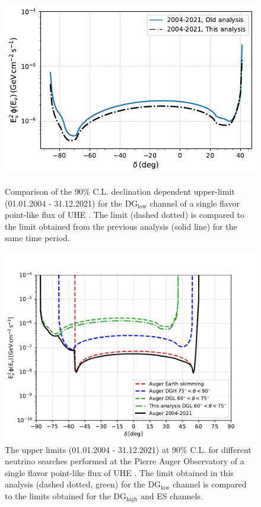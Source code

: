 \begin{figure}[h!]
  \centering
  \includegraphics[width=\textwidth]{thesis_figures/PointLimits/Point_comp_combined_2.pdf}
  \caption{Comparison of the 90\% C.L. declination dependent upper-limit (01.01.2004 - 31.12.2021) for the DG$_{\text{low}}$ channel of a single flavor point-like flux of UHE . The limit (dashed dotted) is compared to the limit obtained from the previous analysis (solid line) for the same time period.}
  \label{fig:Dec_limit_comb2}
  \includegraphics[width=\textwidth]{thesis_figures/PointLimits/Point_comp_combined_3.pdf}
  \caption{The upper limits  (01.01.2004 - 31.12.2021) at 90\% C.L. for different neutrino searches performed at the Pierre Auger Observatory of a single flavor point-like flux of UHE . The limit obtained in this analysis (dashed dotted, green) for the DG$_{\text{low}}$ channel is compared to the limits obtained for the DG$_{\text{high}}$ and ES channels.}
  \label{fig:Dec_limit_comb3}
\end{figure}

